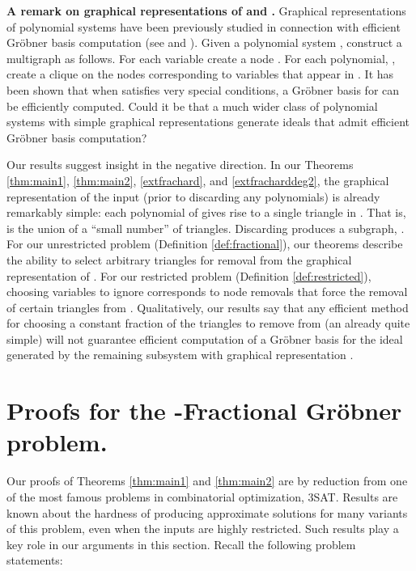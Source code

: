 \documentclass{article}
\begin{document}
\noindent\textbf{A remark on graphical representations of  and .}
Graphical representations of polynomial systems have been previously studied in connection with efficient Gr\"obner basis computation  (see \cite{parrilo} and \cite{deloera}). 
Given a polynomial system , construct a multigraph  as follows. For each variable  create a node . For each polynomial, , create a clique on the nodes corresponding to variables that appear in .
It has been shown that when  satisfies very special conditions, a Gr\"obner basis for  can be efficiently computed. Could it be that a much wider class of polynomial systems with simple graphical representations generate ideals that admit efficient Gr\"obner basis computation? 

Our results suggest insight in the negative direction. In our Theorems \ref{thm:main1}, \ref{thm:main2}, \ref{extfrachard}, and \ref{extfracharddeg2}, the graphical representation of the input  (prior to discarding any polynomials) is already remarkably simple: each polynomial of  gives rise to a single triangle in . That is,  is the union of a ``small number'' of triangles.
Discarding  produces a subgraph, . For our unrestricted problem (Definition \ref{def:fractional}), our theorems describe the ability to select arbitrary triangles for removal from the graphical representation of . For our restricted problem (Definition \ref{def:restricted}), choosing variables to ignore corresponds to node removals that force the removal of certain triangles from . Qualitatively, our results say that any efficient method for choosing a constant fraction of the triangles to remove from (an already quite simple)  will not guarantee efficient computation of a Gr\"{o}bner basis for the ideal generated by the remaining subsystem with graphical representation .\\












\section{Proofs for the \nobreakdash-Fractional Gr\"obner problem.}
\label{sec:fractional}

Our proofs of Theorems \ref{thm:main1} and \ref{thm:main2} are by reduction from one of the most famous problems in combinatorial optimization, 3SAT. Results are known about the hardness of producing approximate solutions for many variants of this problem, even when the inputs are highly restricted. Such results play a key role in our arguments in this section. Recall the following problem statements:
\end{document}
